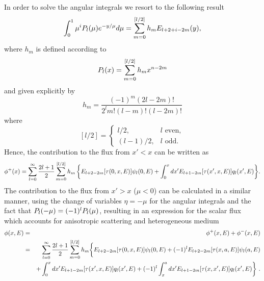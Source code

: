 In order to solve the angular integrals we resort to the following result~\cite{Cengel-1984,Settle-1994}
\begin{equation}\label{eq:Sni}
\int_0^1 { 
	\mu^i P_l(\mu) e^{-y/\mu} d\mu
}
= \sum\limits_{m=0}^{[l/2]} {
	h_m E_{l+2+i-2m}(y)
} ,
\end{equation}
where $h_m$ is defined according to 
\begin{equation}\label{eq:h_i}
P_l(x)=\sum\limits_{m=0}^{[l/2]} {
	h_m x^{n-2m}
}
\end{equation}
and given explicitly by
\begin{equation}\label{eq:h_i-explicit}
h_m = \frac{(-1)^m (2l-2m)!}{2^l m! (l-m)! (l-2m)!}
\end{equation}
where
\begin{equation}\label{eq:l_2}
[l/2] = 
\begin{cases}
l/2, & l \text{ even}, \\
(l - 1)/2, & l \text{ odd}.
\end{cases}
\end{equation}
%
Hence, the contribution to the flux from $x'<x$ can be written as
\begin{equation}\label{eq:phi+2}
\phi^+(x)= \sum\limits_{l=0}^\infty {
	\frac{2l+1}{2} \sum\limits_{m=0}^{[l/2]} { h_m
		\left\{                
		        E_{l+2-2m}[\tau(0,x,E)]                         
		        \psi_l(0,E) 
		       +       \int_0^x { dx'
		        E_{l+1-2m}[\tau(x',x,E)]
		        q_l(x',E)                               
		} 
	\right\}
	}
}.
\end{equation}
The contribution to the flux from $x'>x$ ($\mu<0$) can be calculated in a similar manner, using the change of variables $\eta=-\mu$ for the angular integrals and the fact that $P_l(-\mu)=(-1)^lP_l(\mu)$, resulting in an expression for the scalar flux which accounts for anisotropic scattering and heterogeneous medium
\begin{eqnarray}\label{eq:int-scalar-flux}
\phi(x,E) &=& \phi^+(x,E)+\phi^-(x,E) \nonumber \\
&=& 
\sum\limits_{l=0}^\infty  \frac{2l+1}{2} 
\sum\limits_{m=0}^{[l/2]}  h_m
\bigg\{
E_{l+2-2m}[\tau(0,x,E)]	\psi_l(0,E) 
+(-1)^l E_{l+2-2m}[\tau(x,a,E)] \psi_l(a,E) 
\nonumber \\
&&+
		\int_0^x dx' E_{l+1-2m}[\tau(x',x,E)] q_l(x',E)
		+(-1)^l \int_x^a dx' 
		E_{l+1-2m}[\tau(x,x',E)] q_l(x',E)
\bigg\}	\,\, .		
\end{eqnarray}

